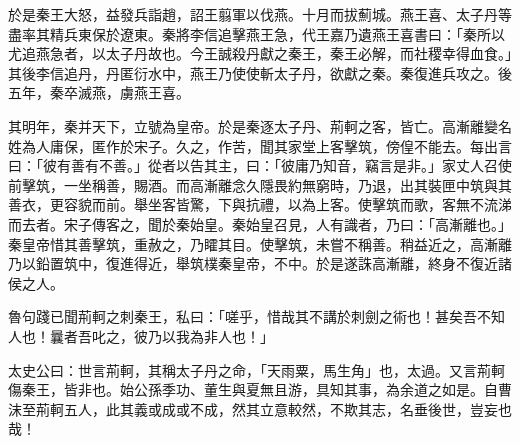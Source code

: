 \begin{pinyinscope}
於是秦王大怒，益發兵詣趙，詔王翦軍以伐燕。十月而拔薊城。燕王喜、太子丹等盡率其精兵東保於遼東。秦將李信追擊燕王急，代王嘉乃遺燕王喜書曰：「秦所以尤追燕急者，以太子丹故也。今王誠殺丹獻之秦王，秦王必解，而社稷幸得血食。」其後李信追丹，丹匿衍水中，燕王乃使使斬太子丹，欲獻之秦。秦復進兵攻之。後五年，秦卒滅燕，虜燕王喜。

其明年，秦并天下，立號為皇帝。於是秦逐太子丹、荊軻之客，皆亡。高漸離變名姓為人庸保，匿作於宋子。久之，作苦，聞其家堂上客擊筑，傍偟不能去。每出言曰：「彼有善有不善。」從者以告其主，曰：「彼庸乃知音，竊言是非。」家丈人召使前擊筑，一坐稱善，賜酒。而高漸離念久隱畏約無窮時，乃退，出其裝匣中筑與其善衣，更容貌而前。舉坐客皆驚，下與抗禮，以為上客。使擊筑而歌，客無不流涕而去者。宋子傳客之，聞於秦始皇。秦始皇召見，人有識者，乃曰：「高漸離也。」秦皇帝惜其善擊筑，重赦之，乃矐其目。使擊筑，未嘗不稱善。稍益近之，高漸離乃以鉛置筑中，復進得近，舉筑樸秦皇帝，不中。於是遂誅高漸離，終身不復近諸侯之人。

魯句踐已聞荊軻之刺秦王，私曰：「嗟乎，惜哉其不講於刺劍之術也！甚矣吾不知人也！曩者吾叱之，彼乃以我為非人也！」

太史公曰：世言荊軻，其稱太子丹之命，「天雨粟，馬生角」也，太過。又言荊軻傷秦王，皆非也。始公孫季功、董生與夏無且游，具知其事，為余道之如是。自曹沫至荊軻五人，此其義或成或不成，然其立意較然，不欺其志，名垂後世，豈妄也哉！


\end{pinyinscope}